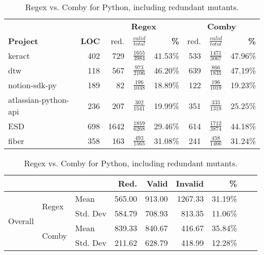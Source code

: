 \documentclass[sigconf,review, anonymous]{acmart}
\begin{document}
\begin{table}[hbtp]
\centering
{\small
\caption{Regex vs. Comby for Python, including redundant mutants.}
\label{tab:table_pyrust}
\begin{tabularx}{\columnwidth}{X|r|rcr|rcr}
\toprule\toprule
                 &                 & \multicolumn{3}{c|}{\textbf{Regex}}             &\multicolumn{3}{c}{\textbf{Comby}}  \\[1ex]
\textbf{Project} & \textbf{LOC}    & red.  & $\frac{valid}{total}$ & \textbf{\%} & red. & $\frac{valid}{total}$ &  \textbf{\%} \\[1ex]\midrule
keract           & 402             & 729       & $\frac{1655}{3984}$   & 41.53\%     & 533       & $\frac{1471}{3067}$   & 47.96\% \\[1ex]
dtw              & 118             & 567       & $\frac{973}{2106}$   & 46.20\%     & 639       & $\frac{866}{1835}$   & 47.19\% \\[1ex]
notion-sdk-py    & 189             & 82        & $\frac{196}{1038}$   & 18.89\%     & 122       & $\frac{196}{1019}$   & 19.23\% \\[1ex]
atlassian-python-api    & 236             & 207        & $\frac{302}{1541}$   & 19.99\%     & 351       & $\frac{333}{1319}$   & 25.25\% \\[1ex]
ESD              & 698            & 1642      & $\frac{1859}{6268}$   & 29.46\%     & 614       & $\frac{1712}{3874}$   & 44.18\% \\[1ex]
fiber            & 358            & 163      & $\frac{493}{1565}$   & 31.08\%     & 241       & $\frac{458}{1466}$   & 31.24\% \\[1ex]
\end{tabularx}
\begin{tabularx}{\columnwidth}{Xllrrrrrr}
                  && &  Red.     & Valid  & Invalid  & \% \\\midrule
\multirow{4}{*}{Overall} & \multirow{2}{*}{Regex} & Mean &  565.00 & 913.00 & 1267.33 & 31.19\%  & \\
    &   &  Std. Dev & 584.79  & 708.93 & 813.35 & 11.06\%  \\
 & \multirow{2}{*}{Comby} & Mean & 839.33 & 840.67 & 416.67 & 35.84\% \\
  &   &  Std. Dev &  211.62 & 628.79 & 418.99 & 12.28\%   \\
\end{tabularx}}
\end{table}
\end{document}

